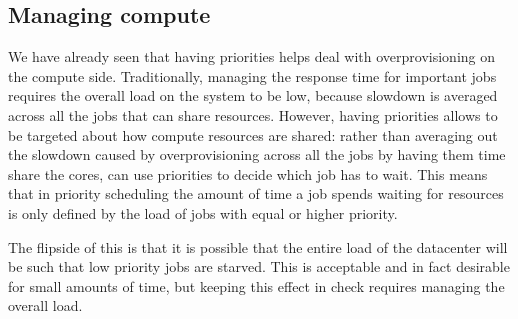 


\subsection{Managing compute}

We have already seen that having priorities helps \sys{} deal with
overprovisioning on the compute side. Traditionally, managing the response time
for important jobs requires the overall load on the system to be low, because
slowdown is averaged across all the jobs that can share resources. However,
having priorities allows \sys{} to be targeted about how compute resources are
shared: rather than averaging out the slowdown caused by overprovisioning across
all the jobs by having them time share the cores, \sys{} can use priorities to
decide which job has to wait. This means that in priority scheduling the amount
of time a job spends waiting for resources is only defined by the load of jobs
with equal or higher priority.

The flipside of this is that it is possible that the entire load of the
datacenter will be such that low priority jobs are starved. This is acceptable
and in fact desirable for small amounts of time, but keeping this effect in
check requires managing the overall load. 

